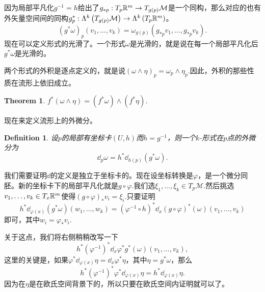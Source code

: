 \documentclass[8pt]{book}
\theoremstyle{plain}%
\newtheorem{theo}{Theorem}[section]%
\newtheorem{defi}{Definition}[section]%
\begin{document}
因为局部平凡化$g^{-1}=h$给出了$g_{*p}:T_{p}\mathbb{R}^m\to T_{g(p)}\mathcal{M}$是一个同构，那么对应的也有外矢量空间间的同构$g^*_p:\Lambda^k\left(T_{g(p)}\mathcal{M}\right)\to \Lambda^k\left(T_{p}\mathbb{R}^m\right)$。
\[
	(g^*\omega)_p(v_1,\dots,v_k)=\omega_{g(p)}\left(g_{*p}v_1,\dots,g_{*p}v_k\right).
\]
现在可以定义形式的光滑了。一个形式$\omega$是光滑的，就是说在每一个局部平凡化后$g^*\omega$是光滑的。

两个形式的外积是逐点定义的，就是说$(\omega\wedge\eta)_p=\omega_p\wedge\eta_p$.因此，外积的那些性质在流形上依旧成立。
\begin{theo}
$f^*(\omega\wedge\eta)=(f^*\omega)\wedge(f^*\eta)$.
\end{theo}
现在来定义流形上的外微分。
\begin{defi}
设$p$的局部有坐标卡$(U,h)$而$h=g^{-1}$，则一个$k$-形式在$p$点的外微分为
\[
	\dd_p\omega=h^* \dd_{h(p)}\left(g^*\omega\right).
\]
\end{defi}
我们需要证明$\dd$的定义是独立于坐标卡的。现在设坐标转换是$\varphi$，是一个微分同胚。新的坐标卡下的局部平凡化就是$g\circ \varphi$.我们选$\xi_1,\dots,\xi_k \in T_p\mathcal{M}$.然后挑选$v_1,\dots,v_k \in T_x\mathbb{R}^m$使得$(g\circ \varphi)_*v_i=\xi_i$.只要证明
\[
h^* \dd_{\varphi(x)}(g^*\omega)(w_1,\dots,w_k)=\left(\varphi^{-1}\circ h\right)^*\dd_{x}(g\circ \varphi)^*(\omega)(v_1,\dots,v_k)
\]
即可，其中$w_i=\varphi_*v_i$.

关于这点，我们将右侧稍稍改写一下
\[
h^*\left(\varphi^{-1}\right)^*\dd_{x}\varphi^*g^*(\omega)(v_1,\dots,v_k),
\]
这里的关键是，如果$\varphi^* \dd_{\varphi(x)} \eta=\dd _x\varphi^* \eta$，其中$\eta=g^*\omega$，那么
\[
h^*\left(\varphi^{-1}\right)^*\varphi^*\dd_{\varphi(x)}\eta=h^*\dd_{\varphi(x)}\eta.
\]
因为在$\eta$是在欧氏空间背景下的，所以只要在欧氏空间内证明就可以了。
\end{document}
